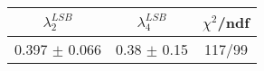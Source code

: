 \begin{tabular}{c|c||c}
$\lambda_{2}^{LSB}$ & $\lambda_4^{LSB}$ & $\chi^{2}$/ndf \\
\hline
0.397 $\pm$ 0.066 & 0.38 $\pm$ 0.15 & 117/99\\
\end{tabular}
